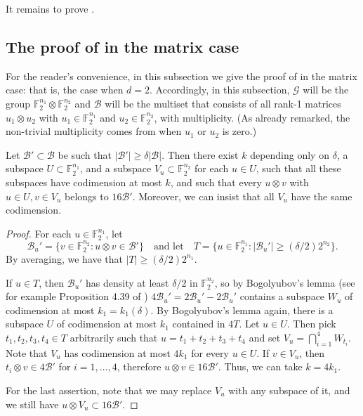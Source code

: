 \documentclass{toc}
\newcommand\F{\mathbb{F}}
\renewcommand\d{\delta}
\newcommand \cB{\mathcal B}
\newcommand \cG{\mathcal G}
\newcommand \s{\subset}
\begin{document}
It remains to prove .

\subsection{The proof of  in the matrix case}

For the reader's convenience, in this subsection we give the proof of  in the matrix case: that is, the case when $d=2$. Accordingly, in this subsection, $\cG$ will be the group $\F_2^{n_1}\otimes \F_2^{n_2}$ and $\cB$ will be the multiset that consists of all rank-1 matrices $u_1\otimes u_2$ with $u_1\in \F_2^{n_1}$ and $u_2\in \F_2^{n_2}$, with multiplicity. (As already remarked, the non-trivial multiplicity comes from when $u_1$ or $u_2$ is zero.)

\begin{lemma} \label{findstructure}
	Let $\cB'\subset \cB$ be such that $|\cB'|\geq \delta |\cB|$. Then there exist $k$ depending only on $\delta$, a subspace $U\subset \F_2^{n_1}$, and a subspace $V_u\subset\F_2^{n_2}$ for each $u\in U$, such that all these subspaces have codimension at most $k$, and such that every $u\otimes v$ with $u\in U,v\in V_u$ belongs to $16\cB'$. Moreover, we can insist that all $V_u$ have the same codimension.
\end{lemma}

\begin{proof}
  For each $u\in \F_2^{n_1}$, let
  \[
    \cB_u'=\{v\in \F_2^{n_2}: u\otimes v\in \cB'\} \quad\text{and let}\quad T=\{u\in \F_2^{n_1}: |\cB_u'|\geq ({\delta}/{2}) 2^{n_2}\}.
  \]
  By averaging, we have that $|T|\geq ({\delta}/{2}) 2^{n_1}$.
	
	If $u\in T$, then $\cB_u'$ has density at least ${\delta}/{2}$ in $\F_2^{n_2}$, so by Bogolyubov's lemma (see for example Proposition 4.39 of \cite{taovu}) $4\cB_u'=2\cB_u'-2\cB_u'$ contains a subspace $W_u$ of codimension at most $k_1=k_1(\d)$. By Bogolyubov's lemma again, there is a subspace $U$ of codimension at most $k_1$ contained in $4T$. Let $u\in U$. Then pick $t_1,t_2,t_3,t_4\in T$ arbitrarily such that $u=t_1+t_2+t_3+t_4$ and set $V_u=\bigcap_{i=1}^4 W_{t_i}$. Note that $V_u$ has codimension at most $4k_1$ for every $u\in U$. If $v\in V_u$, then $t_i\otimes v\in 4\cB'$ for $i=1,\dots,4$, therefore $u\otimes v\in 16\cB'$. Thus, we can take $k=4k_1$.
	
	For the last assertion, note that we may replace $V_u$ with any subspace of it, and we still have $u\otimes V_u\s 16\cB'$.
\end{proof}
\end{document}
